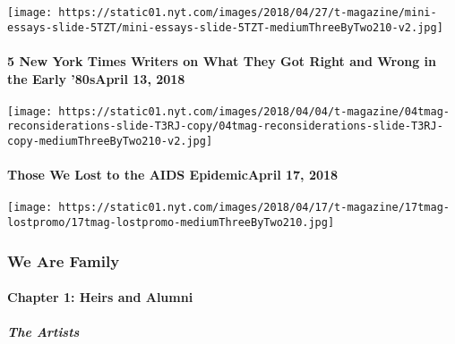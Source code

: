 \texttt{[image: https://static01.nyt.com/images/2018/04/27/t-magazine/mini-essays-slide-5TZT/mini-essays-slide-5TZT-mediumThreeByTwo210-v2.jpg]}
\href{https://www.nytimes.com/2018/04/13/t-magazine/nyt-writers-80s-coverage.html}{}

\hypertarget{5-new-york-times-writers-on-what-they-got-right-and-wrong-in-the-early-80sapril-13-2018}{%
\paragraph{5 New York Times Writers on What They Got Right and Wrong in
the Early '80sApril 13,
2018}\label{5-new-york-times-writers-on-what-they-got-right-and-wrong-in-the-early-80sapril-13-2018}}

\texttt{[image: https://static01.nyt.com/images/2018/04/04/t-magazine/04tmag-reconsiderations-slide-T3RJ-copy/04tmag-reconsiderations-slide-T3RJ-copy-mediumThreeByTwo210-v2.jpg]}
\href{https://www.nytimes.com/interactive/2018/04/17/t-magazine/aids-epidemic-deaths-new-york.html}{}

\hypertarget{those-we-lost-to-the-aids-epidemicapril-17-2018}{%
\paragraph{Those We Lost to the AIDS EpidemicApril 17,
2018}\label{those-we-lost-to-the-aids-epidemicapril-17-2018}}

\texttt{[image: https://static01.nyt.com/images/2018/04/17/t-magazine/17tmag-lostpromo/17tmag-lostpromo-mediumThreeByTwo210.jpg]}

\hypertarget{we-are-family-1}{%
\subsubsection{We Are Family}\label{we-are-family-1}}

\hypertarget{chapter-1-heirs-and-alumni}{%
\paragraph{Chapter 1: Heirs and
Alumni}\label{chapter-1-heirs-and-alumni}}

\href{/interactive/2020/04/13/t-magazine/black-art-galleries.html}{}

\hypertarget{the-artists}{%
\subparagraph{The Artists}\label{the-artists}}

\href{/interactive/2020/04/13/t-magazine/italian-fashion-design-houses.html}{}

